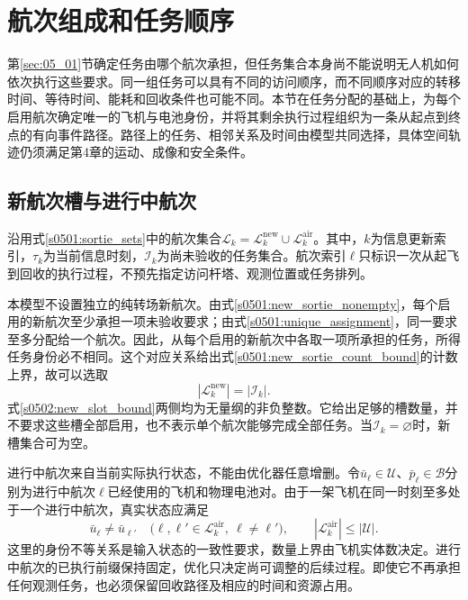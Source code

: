\section{航次组成和任务顺序}
\label{sec:05_02}

第\ref{sec:05_01}节确定任务由哪个航次承担，但任务集合本身尚不能说明无人机如何依次执行这些要求。同一组任务可以具有不同的访问顺序，而不同顺序对应的转移时间、等待时间、能耗和回收条件也可能不同。本节在任务分配的基础上，为每个启用航次确定唯一的飞机与电池身份，并将其剩余执行过程组织为一条从起点到终点的有向事件路径。路径上的任务、相邻关系及时间由模型共同选择，具体空间轨迹仍须满足第4章的运动、成像和安全条件。

\subsection{新航次槽与进行中航次}

沿用式\eqref{s0501:sortie_sets}中的航次集合$\mathcal L_k=\mathcal L_k^{\mathrm{new}}\cup\mathcal L_k^{\mathrm{air}}$。其中，$k$为信息更新索引，$\tau_k$为当前信息时刻，$\mathcal I_k$为尚未验收的任务集合。航次索引$\ell$只标识一次从起飞到回收的执行过程，不预先指定访问杆塔、观测位置或任务排列。

本模型不设置独立的纯转场新航次。由式\eqref{s0501:new_sortie_nonempty}，每个启用的新航次至少承担一项未验收要求；由式\eqref{s0501:unique_assignment}，同一要求至多分配给一个航次。因此，从每个启用的新航次中各取一项所承担的任务，所得任务身份必不相同。这个对应关系给出式\eqref{s0501:new_sortie_count_bound}的计数上界，故可以选取
\begin{equation}
 |\mathcal L_k^{\mathrm{new}}|=|\mathcal I_k|.
 \label{s0502:new_slot_bound}
\end{equation}
式\eqref{s0502:new_slot_bound}两侧均为无量纲的非负整数。它给出足够的槽数量，并不要求这些槽全部启用，也不表示单个航次能够完成全部任务。当$\mathcal I_k=\varnothing$时，新槽集合可为空。

进行中航次来自当前实际执行状态，不能由优化器任意增删。令$\bar u_\ell\in\mathcal U$、$\bar p_\ell\in\mathcal B$分别为进行中航次$\ell$已经使用的飞机和物理电池对。由于一架飞机在同一时刻至多处于一个进行中航次，真实状态应满足
\begin{equation}
 \bar u_\ell\ne\bar u_{\ell'}
 \quad\bigl(\ell,\ell'\in\mathcal L_k^{\mathrm{air}},\ \ell\ne\ell'\bigr),
 \qquad
 |\mathcal L_k^{\mathrm{air}}|\le|\mathcal U|.
 \label{s0502:ongoing_count}
\end{equation}
这里的身份不等关系是输入状态的一致性要求，数量上界由飞机实体数决定。进行中航次的已执行前缀保持固定，优化只决定尚可调整的后续过程。即使它不再承担任何观测任务，也必须保留回收路径及相应的时间和资源占用。

